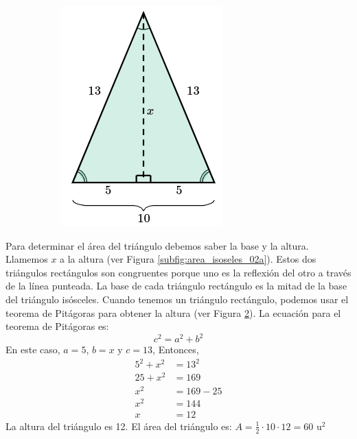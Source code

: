 \begin{solutionbox}{7cm}
\begin{figure}
\begin{subfigure}{0.45\linewidth}
            \includegraphics[width=\linewidth]{../images/area_isoseles_02b.png}
            \caption{}
            \label{subfig:area_isoseles_02b}
        \end{subfigure}
    \end{figure}
    Para determinar el área del triángulo debemos saber la base y la altura. Llamemos $x$ a la altura (ver Figura \ref{subfig:area_isoseles_02a}).
    Estos dos triángulos rectángulos son congruentes porque uno es la reflexión del otro a través de la línea punteada.
    La base de cada triángulo rectángulo es la mitad de la base del triángulo isósceles.
    Cuando tenemos un triángulo rectángulo, podemos usar el teorema de Pitágoras para obtener la altura (ver Figura \ref{subfig:area_isoseles_02b}).
    La ecuación para el teorema de Pitágoras es:
    \[c^2=a^2+b^2\]
    En este caso, $a=5$, $b=x$ y $c=13$, Entonces,
    \begin{align*}
        5^2+x^2 & =13^2   \\
        25+x^2  & =169    \\
        x^2     & =169-25 \\
        x^2     & =144    \\
        x       & =12
    \end{align*}
    La altura del triángulo es 12.
    El área del triángulo es: $A=\frac{1}{2}\cdot 10 \cdot 12 = 60 \text{ u}^2$
\end{solutionbox}